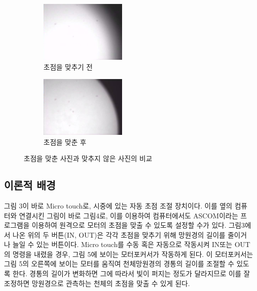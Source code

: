 \documentclass{abstract_hutech}
\begin{document}
\begin{figure}[h]
\begin{subfigure}{0.23\textwidth}
\centering
\includegraphics[width=1\linewidth, height=3cm]{before}
\caption{초점을 맞추기 전}
\label{fig:before}
\end{subfigure}
\begin{subfigure}{0.23\textwidth}
\centering
\includegraphics[width=1\linewidth, height=3cm]{after}
\caption{초점을 맞춘 후}
\label{fig:after}
\end{subfigure}
\caption{초점을 맞춘 사진과 맞추지 않은 사진의 비교}
\end{figure}



\subsection{이론적 배경}

그림 3이 바로 Micro touch로, 시중에 있는 자동 초점 조절 장치이다. 이를 옆의 컴퓨터와 연결시킨 그림이 바로 그림4로, 이를 이용하여 컴퓨터에서도 ASCOM이라는 프로그램을 이용하여 원격으로 모터의 초점을 맞출 수 있도록 설정할 수가 있다. 그림3에서 나온 위의 두 버튼(IN, OUT)은 각각 초점을 맞추기 위해 망원경의 길이를 줄이거나 늘일 수 있는 버튼이다. Micro touch를 수동 혹은 자동으로 작동시켜 IN또는 OUT의 명령을 내렸을 경우, 그림 5에 보이는 모터포커서가 작동하게 된다. 이 모터포커서는 그림 5의 오른쪽에 보이는 모터를 움직여 천체망원경의 경통의 길이를 조절할 수 있도록 한다. 경통의 길이가 변화하면 그에 따라서 빛이 퍼지는 정도가 달라지므로 이를 잘 조정하면 망원경으로 관측하는 천체의 초점을 맞출 수 있게 된다.
\end{document}

